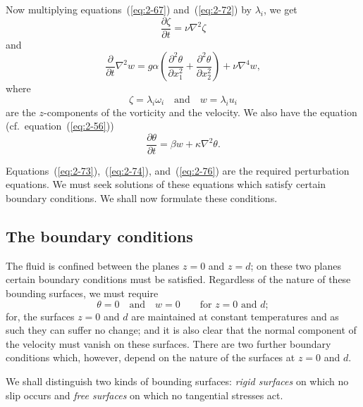 Now multiplying equations~(\ref{eq:2-67}) and~(\ref{eq:2-72}) by $\lambda_i$, we get
\begin{equation}
\label{eq:2-73}
\frac{\partial\zeta}{\partial t} = \nu\nabla^2\zeta
\end{equation}
and
\begin{equation}
\label{eq:2-74}
\frac{\partial}{\partial t}\nabla^2 w = g\alpha\!\left(\frac{\partial^2\theta}{\partial x_1^2}+\frac{\partial^2\theta}{\partial x_2^2}\right) + \nu\nabla^4 w,
\end{equation}
where
\begin{equation}
\label{eq:2-75}
\zeta = \lambda_i\omega_i \quad\text{and}\quad w = \lambda_i u_i
\end{equation}
are the $z$-components of the vorticity and the velocity. We also have
the equation (cf.\ equation~(\ref{eq:2-56}))
\begin{equation}
\label{eq:2-76}
\frac{\partial\theta}{\partial t} = \beta w + \kappa\nabla^2\theta.
\end{equation}

Equations~(\ref{eq:2-73}),~(\ref{eq:2-74}), and~(\ref{eq:2-76}) are the required perturbation equations.
We must seek solutions of these equations which satisfy certain boundary
conditions. We shall now formulate these conditions.

\subsection{The boundary conditions}\label{sec:9a}

The fluid is confined between the planes $z = 0$ and $z = d$; on these
two planes certain boundary conditions must be satisfied. Regardless
of the nature of these bounding surfaces, we must require
\begin{equation}
\label{eq:2-77}
\theta = 0 \quad\text{and}\quad w = 0 \qquad\text{for } z = 0 \text{ and } d;
\end{equation}
for, the surfaces $z = 0$ and $d$ are maintained at constant temperatures
and as such they can suffer no change; and it is also clear that the normal
component of the velocity must vanish on these surfaces. There are two
further boundary conditions which, however, depend on the nature of
the surfaces at $z = 0$ and $d$.

We shall distinguish two kinds of bounding surfaces: \emph{rigid surfaces} on
which no slip occurs and \emph{free surfaces} on which no tangential stresses act.

